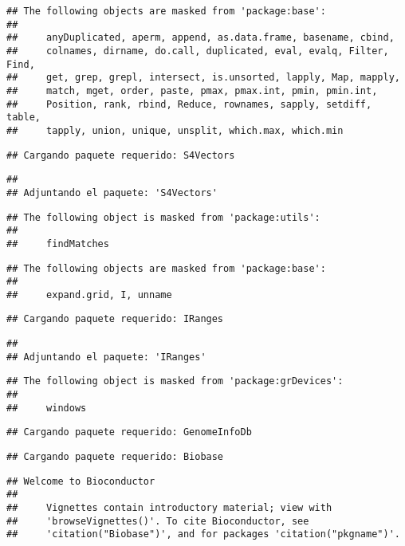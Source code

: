\documentclass[
]{article}
\begin{document}
\begin{verbatim}
## The following objects are masked from 'package:base':
## 
##     anyDuplicated, aperm, append, as.data.frame, basename, cbind,
##     colnames, dirname, do.call, duplicated, eval, evalq, Filter, Find,
##     get, grep, grepl, intersect, is.unsorted, lapply, Map, mapply,
##     match, mget, order, paste, pmax, pmax.int, pmin, pmin.int,
##     Position, rank, rbind, Reduce, rownames, sapply, setdiff, table,
##     tapply, union, unique, unsplit, which.max, which.min
\end{verbatim}

\begin{verbatim}
## Cargando paquete requerido: S4Vectors
\end{verbatim}

\begin{verbatim}
## 
## Adjuntando el paquete: 'S4Vectors'
\end{verbatim}

\begin{verbatim}
## The following object is masked from 'package:utils':
## 
##     findMatches
\end{verbatim}

\begin{verbatim}
## The following objects are masked from 'package:base':
## 
##     expand.grid, I, unname
\end{verbatim}

\begin{verbatim}
## Cargando paquete requerido: IRanges
\end{verbatim}

\begin{verbatim}
## 
## Adjuntando el paquete: 'IRanges'
\end{verbatim}

\begin{verbatim}
## The following object is masked from 'package:grDevices':
## 
##     windows
\end{verbatim}

\begin{verbatim}
## Cargando paquete requerido: GenomeInfoDb
\end{verbatim}

\begin{verbatim}
## Cargando paquete requerido: Biobase
\end{verbatim}

\begin{verbatim}
## Welcome to Bioconductor
## 
##     Vignettes contain introductory material; view with
##     'browseVignettes()'. To cite Bioconductor, see
##     'citation("Biobase")', and for packages 'citation("pkgname")'.
\end{verbatim}
\end{document}
